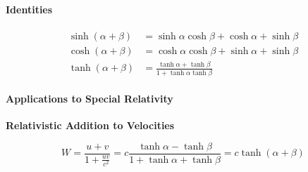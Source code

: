 \documentclass[svgnames]{article}   	%
\begin{document}
\paragraph{Identities} 

\begin{align*}
  \sinh (\alpha + \beta) &= \sinh \alpha \cosh \beta + \cosh \alpha + \sinh
  \beta \\
  \cosh (\alpha + \beta) &= \cosh \alpha \cosh \beta + \sinh \alpha + \sinh
  \beta \\
  \tanh (\alpha + \beta) &= \frac{\tanh \alpha + \tanh \beta}{1 + \tanh \alpha
  \tanh \beta}
\end{align*}

\paragraph{Applications to Special Relativity}

\textbf{Relativistic Addition to Velocities}

\[
 W = \frac{u + v}{1 + \frac{uv}{c^2}} = c \frac{\tanh \alpha - \tanh\beta}{1
 + \tanh \alpha + \tanh \beta} = c\tanh(\alpha + \beta) 
\]
\end{document}
